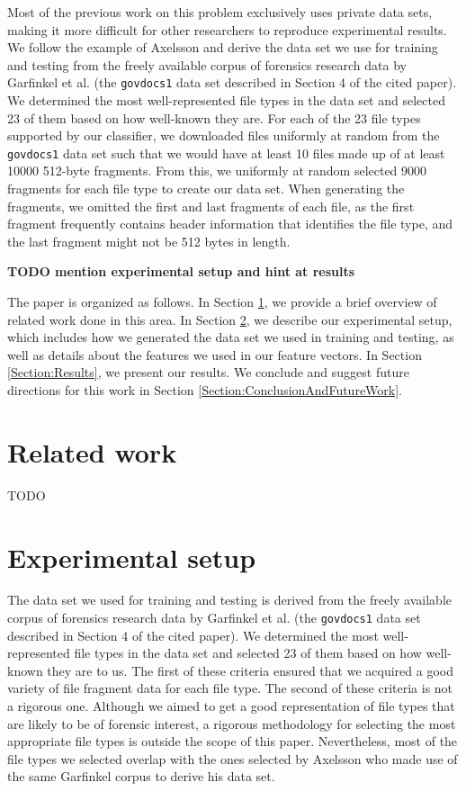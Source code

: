 \documentclass[letter,11pt]{article}
\begin{document}
Most of the previous work on this problem exclusively uses private data sets, making it more difficult for other researchers to reproduce experimental results. We follow the example of Axelsson \cite{Axelsson10} and derive the data set we use for training and testing from the freely available corpus of forensics research data by Garfinkel et al. \cite{Garfinkel09} (the \texttt{govdocs1} data set described in Section 4 of the cited paper). We determined the most well-represented file types in the data set and selected 23 of them based on how well-known they are. For each of the 23 file types supported by our classifier, we downloaded files uniformly at random from the \texttt{govdocs1} data set such that we would have at least 10 files made up of at least 10000 512-byte fragments. From this, we uniformly at random selected 9000 fragments for each file type to create our data set. When generating the fragments, we omitted the first and last fragments of each file, as the first fragment frequently contains header information that identifies the file type, and the last fragment might not be 512 bytes in length.

\textbf{TODO mention experimental setup and hint at results}

The paper is organized as follows. In Section \ref{Section:RelatedWork}, we provide a brief overview of related work done in this area. In Section \ref{Section:ExperimentalSetup}, we describe our experimental setup, which includes how we generated the data set we used in training and testing, as well as details about the features we used in our feature vectors. In Section \ref{Section:Results}, we present our results. We conclude and suggest future directions for this work in Section \ref{Section:ConclusionAndFutureWork}.

\section{Related work}
\label{Section:RelatedWork}
TODO \cite{Conti10, Garfinkel09, Axelsson10, Calhoun08, Li10, Veenman07}

\section{Experimental setup}
\label{Section:ExperimentalSetup}
The data set we used for training and testing is derived from the freely available corpus of forensics research data by Garfinkel et al. \cite{Garfinkel09} (the \texttt{govdocs1} data set described in Section 4 of the cited paper). We determined the most well-represented file types in the data set and selected 23 of them based on how well-known they are to us. The first of these criteria ensured that we acquired a good variety of file fragment data for each file type. The second of these criteria is not a rigorous one. Although we aimed to get a good representation of file types that are likely to be of forensic interest, a rigorous methodology for selecting the most appropriate file types is outside the scope of this paper. Nevertheless, most of the file types we selected overlap with the ones selected by Axelsson \cite{Axelsson10} who made use of the same Garfinkel corpus to derive his data set.
\end{document}
